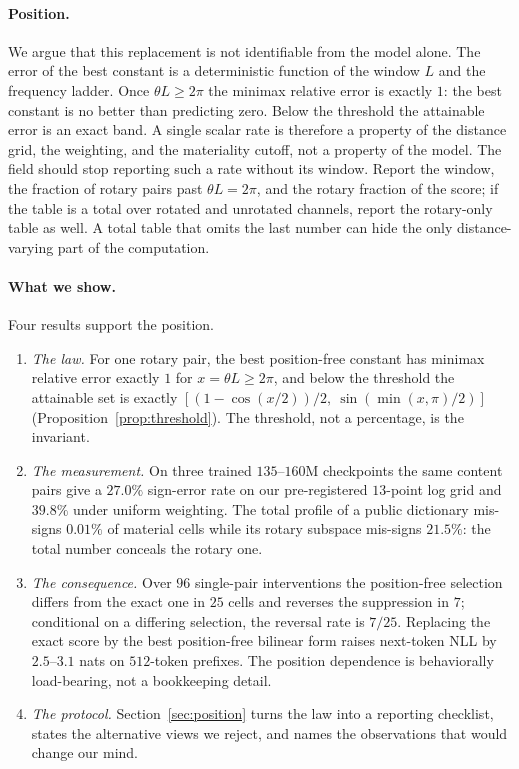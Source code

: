 \documentclass{article}
\theoremstyle{plain}
\theoremstyle{remark}
\begin{document}
\paragraph{Position.} We argue that this replacement is not identifiable from
the model alone. The error of the best constant is a deterministic function of
the window $L$ and the frequency ladder. Once $\theta L\ge2\pi$ the minimax
relative error is exactly $1$: the best constant is no better than predicting
zero. Below the threshold the attainable error is an exact band. A single
scalar rate is therefore a property of the distance grid, the weighting, and
the materiality cutoff, not a property of the model. The field should stop
reporting such a rate without its window. Report the window, the fraction of
rotary pairs past $\theta L=2\pi$, and the rotary fraction of the score; if the
table is a total over rotated and unrotated channels, report the rotary-only
table as well. A total table that omits the last number can hide the only
distance-varying part of the computation.

\paragraph{What we show.} Four results support the position.
\begin{enumerate}
\item \emph{The law.} For one rotary pair, the best position-free constant has
minimax relative error exactly $1$ for $x=\theta L\ge2\pi$, and below the
threshold the attainable set is exactly
$[(1-\cos(x/2))/2,\ \sin(\min(x,\pi)/2)]$
(Proposition~\ref{prop:threshold}). The threshold, not a percentage, is the
invariant.
\item \emph{The measurement.} On three trained $135$--$160$M checkpoints the
same content pairs give a $27.0\%$ sign-error rate on our pre-registered
$13$-point log grid and $39.8\%$ under uniform weighting. The total profile of
a public dictionary mis-signs $0.01\%$ of material cells while its rotary
subspace mis-signs $21.5\%$: the total number conceals the rotary one.
\item \emph{The consequence.} Over $96$ single-pair interventions the
position-free selection differs from the exact one in $25$ cells and reverses
the suppression in $7$; conditional on a differing selection, the reversal rate
is $7/25$. Replacing the exact score by the best position-free bilinear form
raises next-token NLL by $2.5$--$3.1$ nats on $512$-token prefixes. The position
dependence is behaviorally load-bearing, not a bookkeeping detail.
\item \emph{The protocol.} Section~\ref{sec:position} turns the law into a
reporting checklist, states the alternative views we reject, and names the
observations that would change our mind.
\end{enumerate}
\end{document}
